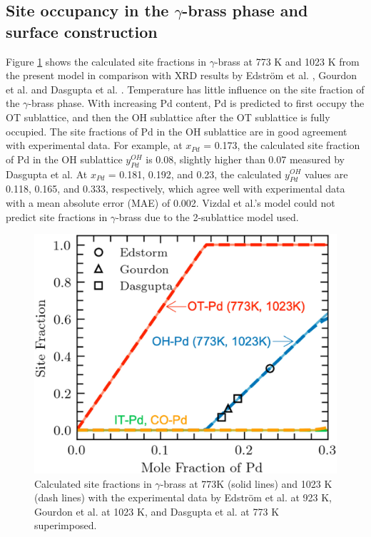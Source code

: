 \subsection{Site occupancy in the $\gamma$-brass phase and surface construction} \label{intermetallics:ssec:PdZnsite}
Figure \ref{intermetallics:fig:PdZnSOC} shows the calculated site fractions in $\gamma$-brass at 773 K and 1023 K from the present model in comparison with XRD results by Edström et al. \cite{strom1969x}, Gourdon et al. \cite{gourdon2006intergrowth} and Dasgupta et al. \cite{Dasgupta2022}. Temperature has little influence on the site fraction of the $\gamma$-brass phase. With increasing Pd content, Pd is predicted to first occupy the OT sublattice, and then the OH sublattice after the OT sublattice is fully occupied. The site fractions of Pd in the OH sublattice are in good agreement with experimental data. For example, at $x_{Pd}$ = 0.173, the calculated site fraction of Pd in the OH sublattice $y_{Pd}^{OH}$ is 0.08, slightly higher than 0.07 measured by Dasgupta et al.\cite{Dasgupta2022} At $x_{Pd}$ = 0.181, 0.192, and 0.23, the calculated $y_{Pd}^{OH}$ values are 0.118, 0.165, and 0.333, respectively, which agree well with experimental data with a mean absolute error (MAE) of 0.002. Vizdal et al.'s \cite{vizdal2006experimental} model could not predict site fractions in $\gamma$-brass due to the 2-sublattice model used.

\begin{figure}[H]
    \centering
    \includegraphics[width=0.5\linewidth]{intermetallics/Intermetallics-PdZnSOC.jpg}
    \caption{Calculated site fractions in $\gamma$-brass at 773K (solid lines) and 1023 K (dash lines) with the experimental data by Edström et al. \cite{strom1969x} at 923 K, Gourdon et al. \cite{gourdon2006intergrowth} at 1023 K, and Dasgupta et al. \cite{Dasgupta2022} at 773 K superimposed.}
    \label{intermetallics:fig:PdZnSOC}
\end{figure}


